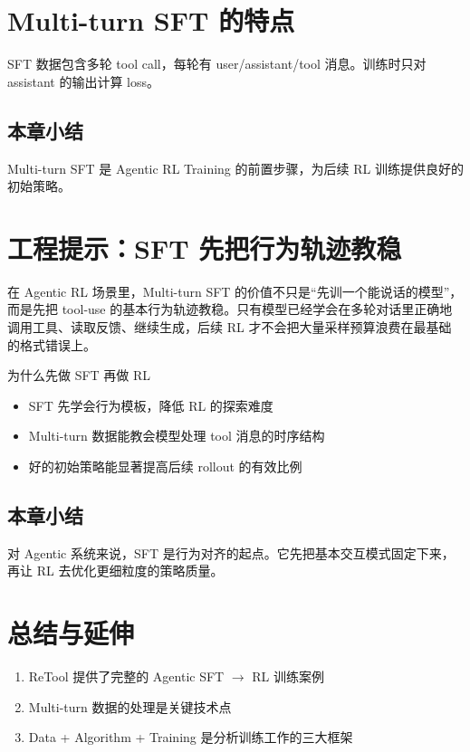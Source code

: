 \documentclass[a4paper]{article}
\begin{document}
\section{Multi-turn SFT 的特点}
SFT 数据包含多轮 tool call，每轮有 user/assistant/tool 消息。训练时只对 assistant 的输出计算 loss。

\subsection{本章小结}
Multi-turn SFT 是 Agentic RL Training 的前置步骤，为后续 RL 训练提供良好的初始策略。

\newpage
\section{工程提示：SFT 先把行为轨迹教稳}
在 Agentic RL 场景里，Multi-turn SFT 的价值不只是“先训一个能说话的模型”，而是先把 tool-use 的基本行为轨迹教稳。只有模型已经学会在多轮对话里正确地调用工具、读取反馈、继续生成，后续 RL 才不会把大量采样预算浪费在最基础的格式错误上。

\begin{knowledgebox}{为什么先做 SFT 再做 RL}
\begin{itemize}
  \item SFT 先学会行为模板，降低 RL 的探索难度
  \item Multi-turn 数据能教会模型处理 tool 消息的时序结构
  \item 好的初始策略能显著提高后续 rollout 的有效比例
\end{itemize}
\end{knowledgebox}

\subsection{本章小结}
对 Agentic 系统来说，SFT 是行为对齐的起点。它先把基本交互模式固定下来，再让 RL 去优化更细粒度的策略质量。

\newpage
\section{总结与延伸}
\begin{enumerate}
  \item ReTool 提供了完整的 Agentic SFT $\to$ RL 训练案例
  \item Multi-turn 数据的处理是关键技术点
  \item Data + Algorithm + Training 是分析训练工作的三大框架
\end{enumerate}
\end{document}
